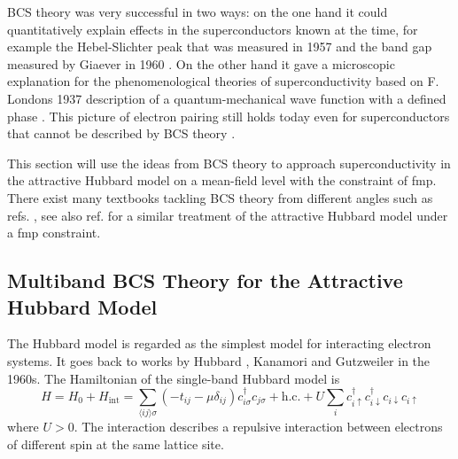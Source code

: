 \documentclass[../main.tex]{subfiles}
\begin{document}
BCS theory was very successful in two ways: on the one hand it could quantitatively explain effects in the superconductors known at the time, for example the Hebel-Slichter peak that was measured in 1957 \cite{hebelNuclearRelaxationSuperconducting1957, hebelNuclearSpinRelaxation1959} and the band gap measured by Giaever in 1960 \cite{giaeverStudySuperconductorsElectron1961}.
On the other hand it gave a microscopic explanation for the phenomenological theories of superconductivity based on F. Londons 1937 description of a quantum-mechanical wave function with a defined phase \cite{londonNewConceptionSupraconductivity1937}.
This picture of electron pairing still holds today even for superconductors that cannot be described by BCS theory \cite{zhouHightemperatureSuperconductivity2021}.

This section will use the ideas from BCS theory to approach superconductivity in the attractive Hubbard model on a mean-field level with the constraint of \gls{fmp}.
There exist many textbooks tackling BCS theory from different angles such as refs. \cite{colemanIntroductionManyBodyPhysics2015, tinkhamIntroductionSuperconductivity1996}, see also ref. \cite{huhtinenSuperconductivityNormalState2023} for a similar treatment of the attractive Hubbard model under a \gls{fmp} constraint.

\subsection*{Multiband BCS Theory for the Attractive Hubbard Model}

The Hubbard model is regarded as the simplest model for interacting electron systems.
It goes back to works by Hubbard \cite{hubbardElectronCorrelationsNarrow1963}, Kanamori \cite{kanamoriElectronCorrelationFerromagnetism1963} and Gutzweiler \cite{gutzwillerEffectCorrelationFerromagnetism1963} in the 1960s.
The Hamiltonian of the  single-band Hubbard model is
\begin{equation}
	H = H_0 + H_{\mathrm{int}} 
	= \sum_{\langle i j \rangle \sigma} \left(-t_{i j} - \mu \delta_{i j}\right) c_{i \sigma}^{\dagger} c_{j \sigma} + \mathrm{h.c.} + U \sum_{i} c_{i \uparrow}^{\dagger} c_{i \downarrow}^{\dagger} c_{i \downarrow} c_{i \uparrow}
	\label{eq:Hubbard interaction repulsive}
\end{equation}
where \(U > 0\).
The interaction describes a repulsive interaction between electrons of different spin at the same lattice site.
\end{document}
